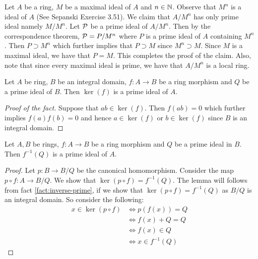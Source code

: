 \begin{example}

    Let $A$ be a ring, $M$ be a maximal ideal of $A$ and $n\in \mathbb N$. Observe that $M^n$ is a ideal of $A$ (See Sepanski Exercise 3.51). We claim that $A/ M^n$ has only prime ideal namely $M / M^n$. Let ${\cal P}$ be a prime ideal of $A / M^n$. Then by the correspondence theorem, ${\cal P} = P/ M^n$ where $P$ is a prime ideal of $A$ containing $M^n$. Then $P\supset M^n$ which further implies that $P \supset M$ since $M^n \supset M$. Since $M$ is a maximal ideal, we have that $P=M$. This completes the proof of the claim. Also, note that since every maximal ideal is prime, we have that $A/M^n$ is a local ring.

\end{example}
 
\begin{fact}
    Let $A$ be ring, $B$ be an integral domain, $f: A\to B$ be a ring morphism and $Q$ be a prime ideal of $B$. Then $\ker (f)$ is a prime ideal of $A$.
    \label{fact:inverse-prime}
\end{fact}
\begin{proof}[Proof of the fact]
    Suppose that $ab \in \ker (f)$. Then $f(ab)=0$ which further implies $f(a)f(b)=0$ and hence $a\in \ker(f)$ or $b\in\ker(f)$ since $B$ is an integral domain.
\end{proof}

\begin{lemma}
    Let $A, B$ be rings, $f:A\to B$ be a ring morphism and $Q$ be a prime ideal in $B$. Then $f^{-1} \left( Q \right)$ is a prime ideal of $A$. 
    \label{lemma:inverse-image-of-prime-ideal}
\end{lemma}
\begin{proof}
    Let $p: B \to B/Q$ be the canonical homomorphism. Consider the map $p \circ f : A \to B/Q$. We show that $\ker (p \circ f) = f^{-1} \left( Q \right)$. The lemma will follows from fact \ref{fact:inverse-prime}, if we show that $\ker (p \circ f) = f^{-1}\left( Q \right)$ as $B/Q$ is an integral domain. So consider the following:
    \begin{align*}
	x \in \ker \left( p \circ f \right) & \Leftrightarrow p (f(x)) = Q \\
					& \Leftrightarrow f(x) + Q = Q \\
					& \Leftrightarrow f(x) \in Q \\
					& \Leftrightarrow x \in f^{-1} \left( Q \right)
    \end{align*}
\end{proof}

